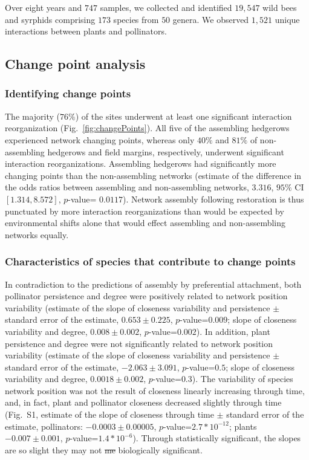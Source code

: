 \documentclass[12pt]{article}
\providecommand{\DIFaddtex}[1]{{\protect\color{blue}\uwave{#1}}} %
\providecommand{\DIFdeltex}[1]{{\protect\color{red}\sout{#1}}}                      %
\providecommand{\DIFaddbegin}{} %
\providecommand{\DIFaddend}{} %
\providecommand{\DIFdelbegin}{} %
\providecommand{\DIFdelend}{} %
\providecommand{\DIFadd}[1]{\texorpdfstring{\DIFaddtex{#1}}{#1}} %
\providecommand{\DIFdel}[1]{\texorpdfstring{\DIFdeltex{#1}}{}} %
\begin{document}
Over eight years and $747$ samples, we collected and identified
$19,547$ wild bees and syrphids comprising $173$ species from $50$
genera. We observed $1,521$ unique interactions between plants and
pollinators.

\subsection*{Change point analysis}
\subsubsection*{Identifying change points}

The majority ($76\%$) of the sites underwent at least one significant
interaction reorganization (Fig.~\ref{fig:changePoints}).  All five of
the assembling hedgerows experienced network changing points, whereas
only $40\%$ and $81\%$ of non-assembling hedgerows and field margins,
respectively, underwent significant interaction
reorganizations. Assembling hedgerows had significantly more changing
points than the non-assembling networks (estimate of the difference in
the odds ratios between assembling and non-assembling networks,
$3.316$, $95\%$ CI $[1.314, 8.572]$, $p$-value= $0.0117$). Network
assembly following restoration is thus punctuated by more interaction
reorganizations than would be expected by environmental shifts alone
that would effect assembling and non-assembling networks equally.

\subsubsection*{Characteristics of species that contribute to change
  points}

In contradiction to the predictions of assembly by preferential
attachment, both pollinator persistence and degree were positively
related to network position variability (estimate of the slope of
closeness variability and persistence $\pm$ standard error of the
estimate, $0.653 \pm 0.225$, $p$-value=$0.009$; slope of closeness
variability and degree, $0.008 \pm 0.002$, $p$-value=$0.002$). In
addition, plant persistence and degree were not significantly related
to network position variability (estimate of the slope of closeness
variability and persistence $\pm$ standard error of the estimate,
$-2.063 \pm 3.091$, $p$-value=$0.5$; slope of closeness variability
and degree, $0.0018 \pm 0.002$, $p$-value=$0.3$). The variability of
species network position was not the result of closeness linearly
increasing through time, and, in fact, plant and pollinator closeness
decreased slightly through time (Fig.~S1, estimate of the slope of
closeness through time $\pm$ standard error of the estimate,
pollinators: $-0.0003 \pm 0.00005$, $p$-value=$2.7*10^{-12}$; plants
$-0.007 \pm 0.001$, $p$-value=$1.4*10^{-6}$). Through statistically
significant, the slopes are so slight they may not \DIFdelbegin \DIFdel{me }\DIFdelend \DIFaddbegin \DIFadd{be }\DIFaddend biologically
significant.
\end{document}
